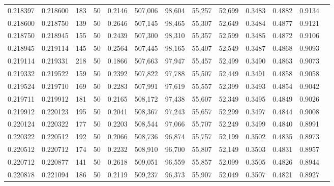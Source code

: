 \begin{tabular}{rrrrrrrrrrrrr}
0.218397 & 0.218600 &   183 &  50 &                                     0.2146 & 507,006 &  98,604 &  55,257 &  52,699 & 0.3483 & 0.4882 & 0.9134 \\
0.218600 & 0.218750 &   139 &  50 &                                     0.2646 & 507,145 &  98,465 &  55,307 &  52,649 & 0.3484 & 0.4877 & 0.9121 \\
0.218750 & 0.218945 &   155 &  50 &                                     0.2439 & 507,300 &  98,310 &  55,357 &  52,599 & 0.3485 & 0.4872 & 0.9106 \\
0.218945 & 0.219114 &   145 &  50 &                                     0.2564 & 507,445 &  98,165 &  55,407 &  52,549 & 0.3487 & 0.4868 & 0.9093 \\
0.219114 & 0.219331 &   218 &  50 &                                     0.1866 & 507,663 &  97,947 &  55,457 &  52,499 & 0.3490 & 0.4863 & 0.9073 \\
0.219332 & 0.219522 &   159 &  50 &                                     0.2392 & 507,822 &  97,788 &  55,507 &  52,449 & 0.3491 & 0.4858 & 0.9058 \\
0.219524 & 0.219710 &   169 &  50 &                                     0.2283 & 507,991 &  97,619 &  55,557 &  52,399 & 0.3493 & 0.4854 & 0.9042 \\
0.219711 & 0.219912 &   181 &  50 &                                     0.2165 & 508,172 &  97,438 &  55,607 &  52,349 & 0.3495 & 0.4849 & 0.9026 \\
0.219912 & 0.220123 &   195 &  50 &                                     0.2041 & 508,367 &  97,243 &  55,657 &  52,299 & 0.3497 & 0.4844 & 0.9008 \\
0.220124 & 0.220322 &   177 &  50 &                                     0.2203 & 508,544 &  97,066 &  55,707 &  52,249 & 0.3499 & 0.4840 & 0.8991 \\
0.220322 & 0.220512 &   192 &  50 &                                     0.2066 & 508,736 &  96,874 &  55,757 &  52,199 & 0.3502 & 0.4835 & 0.8973 \\
0.220512 & 0.220712 &   174 &  50 &                                     0.2232 & 508,910 &  96,700 &  55,807 &  52,149 & 0.3503 & 0.4831 & 0.8957 \\
0.220712 & 0.220877 &   141 &  50 &                                     0.2618 & 509,051 &  96,559 &  55,857 &  52,099 & 0.3505 & 0.4826 & 0.8944 \\
0.220878 & 0.221094 &   186 &  50 &                                     0.2119 & 509,237 &  96,373 &  55,907 &  52,049 & 0.3507 & 0.4821 & 0.8927 \\

\end{tabular}
